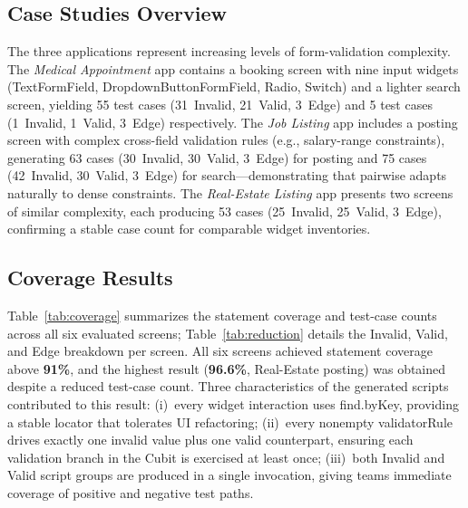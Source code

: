 \documentclass[conference]{IEEEtran}
\renewcommand{\texttt}[1]{\textnormal{#1}}
\begin{document}
\subsection{Case Studies Overview}
The three applications represent increasing levels of form-validation
complexity. The \textit{Medical Appointment} app contains a booking
screen with nine input widgets (TextFormField, DropdownButtonFormField,
Radio, Switch) and a lighter search screen, yielding 55 test cases
(31~Invalid, 21~Valid, 3~Edge) and 5 test cases (1~Invalid, 1~Valid, 3~Edge)
respectively. The \textit{Job Listing} app includes a posting screen
with complex cross-field validation rules (e.g., salary-range
constraints), generating 63 cases (30~Invalid, 30~Valid, 3~Edge) for posting
and 75 cases (42~Invalid, 30~Valid, 3~Edge) for search---demonstrating that
pairwise adapts naturally to dense constraints. The
\textit{Real-Estate Listing} app presents two screens of similar
complexity, each producing 53 cases (25~Invalid, 25~Valid, 3~Edge), confirming
a stable case count for comparable widget inventories.
\subsection{Coverage Results}
Table~\ref{tab:coverage} summarizes the statement coverage and test-case
counts across all six evaluated screens; Table~\ref{tab:reduction}
details the Invalid, Valid, and Edge breakdown per screen. All six screens
achieved statement coverage above \textbf{91\%}, and the highest result
(\textbf{96.6\%}, Real-Estate posting) was obtained despite a
reduced test-case count. Three characteristics of the generated
scripts contributed to this result: (i)~every widget interaction uses
\texttt{find.byKey}, providing a stable locator that tolerates UI
refactoring; (ii)~every nonempty \texttt{validatorRule} drives
exactly one invalid value plus one valid counterpart, ensuring each
validation branch in the Cubit is exercised at least once;
(iii)~both Invalid and Valid script groups are produced in a single invocation,
giving teams immediate coverage of positive and negative test paths.
\end{document}
